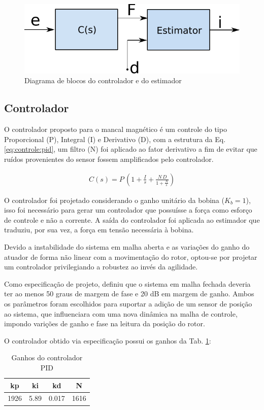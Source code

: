 \begin{figure}[ht!]
	\centering
	\includegraphics[width=0.5\linewidth]{Figs/Modelagem/controlador_estimador}
	\caption{Diagrama de blocos do controlador e do estimador}
	\label{fig:diagrama_controlador_estimador}
\end{figure}

\subsection{Controlador}

O controlador proposto para o mancal magnético é um controle do tipo Proporcional (P), Integral (I) e Derivativo (D), com a estrutura da Eq. \eqref{eq:controle:pid}, um filtro (N) foi aplicado ao fator derivativo a fim de evitar que ruídos provenientes do sensor fossem amplificados pelo controlador.

\begin{align}
	C(s) = P \, \left( 1 + \frac{I}{s} + \frac{N \, D}{ 1 + \frac{N}{s}} \right)
	\label{eq:controle:pid}
\end{align}

O controlador foi projetado considerando o ganho unitário da bobina ($K_b = 1$), isso foi necessário para gerar um controlador que possuísse a força como esforço de controle e não a corrente. A saída do controlador foi aplicada ao estimador que traduziu, por sua vez, a força em tensão necessária à bobina. 

Devido a instabilidade do sistema em malha aberta e as variações do ganho do atuador de forma não linear com a movimentação do rotor, optou-se por projetar um controlador privilegiando a robustez ao invés da agilidade.

Como especificação de projeto, definiu que o sistema em malha fechada deveria ter ao menos 50 graus de margem de fase e 20 dB em margem de ganho. Ambos os parâmetros foram escolhidos para suportar a adição de um sensor de posição ao sistema, que influenciara com uma nova dinâmica na malha de controle, impondo varições de ganho e fase na leitura da posição do rotor.

O controlador obtido via especificação possui os ganhos da Tab. \ref{tab:controle:pid}:

\begin{table}[ht!]
\centering
	\begin{tabular}{c c c c}
	 kp  &  ki & kd &  N  \\
	 \hline \hline
		1926	 &	5.89	& 0.017	&1616
	\end{tabular} 
	\caption{Ganhos do controlador PID}
	\label{tab:controle:pid}
\end{table} 


